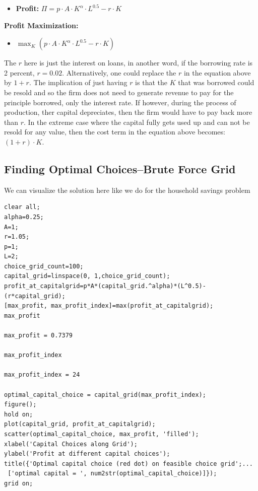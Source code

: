 \documentclass[
]{book}
\providecommand{\tightlist}{%
  \setlength{\itemsep}{0pt}\setlength{\parskip}{0pt}}
\begin{document}
\begin{itemize}
\tightlist
\item
  \textbf{Profit:} \(\Pi =p\cdot A\cdot K^{\alpha } \cdot L^{0.5} -r\cdot K\)
\end{itemize}

\textbf{Profit Maximization:}

\begin{itemize}
\tightlist
\item
  \(\displaystyle \max_K \left(p\cdot A\cdot K^{\alpha } \cdot L^{0.5} -r\cdot K\right)\)
\end{itemize}

The \(r\) here is just the interest on loans, in another word, if the
borrowing rate is 2 percent, \(r=0.02\). Alternatively, one could replace
the \(r\) in the equation above by \(1+r\). The implication of just having
\(r\) is that the \(K\) that was borrowed could be resold and so the firm
does not need to generate revenue to pay for the principle borrowed,
only the interest rate. If however, during the process of production,
ther capital depreciates, then the firm would have to pay back more than
\(r\). In the extreme case where the capital fully gets used up and can
not be resold for any value, then the cost term in the equation above
becomes: \((1+r)\cdot K\).

\hypertarget{finding-optimal-choicesbrute-force-grid-1}{%
\subsection{Finding Optimal Choices--Brute Force Grid}\label{finding-optimal-choicesbrute-force-grid-1}}

We can visualize the solution here like we do for the household savings
problem

\begin{verbatim}
clear all;
alpha=0.25;
A=1;
r=1.05;
p=1;
L=2;
choice_grid_count=100;
capital_grid=linspace(0, 1,choice_grid_count);
profit_at_capitalgrid=p*A*(capital_grid.^alpha)*(L^0.5)-(r*capital_grid);
[max_profit, max_profit_index]=max(profit_at_capitalgrid);
max_profit

max_profit = 0.7379

max_profit_index

max_profit_index = 24

optimal_capital_choice = capital_grid(max_profit_index);
figure();
hold on;
plot(capital_grid, profit_at_capitalgrid);
scatter(optimal_capital_choice, max_profit, 'filled');
xlabel('Capital Choices along Grid');
ylabel('Profit at different capital choices');
title({'Optimal capital choice (red dot) on feasible choice grid';...
 ['optimal capital = ', num2str(optimal_capital_choice)]});
grid on;
\end{verbatim}
\end{document}
